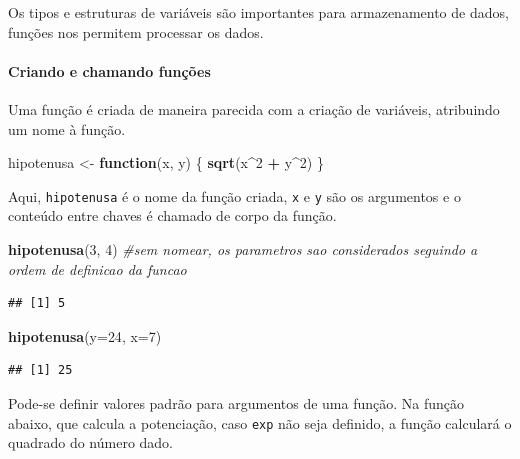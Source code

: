 \documentclass[
]{book}
\newenvironment{Shaded}{\begin{snugshade}}{\end{snugshade}}
\newcommand{\AttributeTok}[1]{\textcolor[rgb]{0.13,0.29,0.53}{#1}}
\newcommand{\CommentTok}[1]{\textcolor[rgb]{0.56,0.35,0.01}{\textit{#1}}}
\newcommand{\ControlFlowTok}[1]{\textcolor[rgb]{0.13,0.29,0.53}{\textbf{#1}}}
\newcommand{\DecValTok}[1]{\textcolor[rgb]{0.00,0.00,0.81}{#1}}
\newcommand{\FunctionTok}[1]{\textcolor[rgb]{0.13,0.29,0.53}{\textbf{#1}}}
\newcommand{\NormalTok}[1]{#1}
\newcommand{\OtherTok}[1]{\textcolor[rgb]{0.56,0.35,0.01}{#1}}
\newcommand{\SpecialCharTok}[1]{\textcolor[rgb]{0.81,0.36,0.00}{\textbf{#1}}}
\begin{document}
Os tipos e estruturas de variáveis são importantes para armazenamento de dados, funções nos permitem processar os dados.

\paragraph{Criando e chamando funções}\label{criando-e-chamando-funuxe7uxf5es}

Uma função é criada de maneira parecida com a criação de variáveis, atribuindo um nome à função.

\begin{Shaded}
\begin{Highlighting}[]
\NormalTok{hipotenusa }\OtherTok{\textless{}{-}} \ControlFlowTok{function}\NormalTok{(x, y) \{}
  \FunctionTok{sqrt}\NormalTok{(x}\SpecialCharTok{\^{}}\DecValTok{2} \SpecialCharTok{+}\NormalTok{ y}\SpecialCharTok{\^{}}\DecValTok{2}\NormalTok{)}
\NormalTok{\}}
\end{Highlighting}
\end{Shaded}

Aqui, \texttt{hipotenusa} é o nome da função criada, \texttt{x} e \texttt{y} são os argumentos e o conteúdo entre chaves é chamado de corpo da função.

\begin{Shaded}
\begin{Highlighting}[]
\FunctionTok{hipotenusa}\NormalTok{(}\DecValTok{3}\NormalTok{, }\DecValTok{4}\NormalTok{) }\CommentTok{\#sem nomear, os parametros sao considerados seguindo a ordem de definicao da funcao}
\end{Highlighting}
\end{Shaded}

\begin{verbatim}
## [1] 5
\end{verbatim}

\begin{Shaded}
\begin{Highlighting}[]
\FunctionTok{hipotenusa}\NormalTok{(}\AttributeTok{y=}\DecValTok{24}\NormalTok{, }\AttributeTok{x=}\DecValTok{7}\NormalTok{)}
\end{Highlighting}
\end{Shaded}

\begin{verbatim}
## [1] 25
\end{verbatim}

Pode-se definir valores padrão para argumentos de uma função.
Na função abaixo, que calcula a potenciação, caso \texttt{exp} não seja definido, a função calculará o quadrado do número dado.
\end{document}
